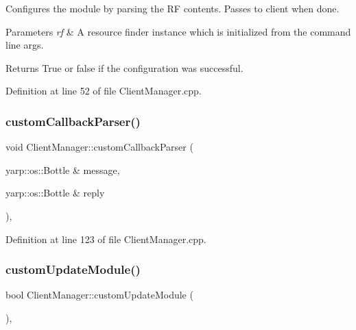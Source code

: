 Configures the module by parsing the RF contents. Passes to client when done. 
\begin{DoxyParams}{Parameters}
{\em rf} & A resource finder instance which is initialized from the command line args.\\
\hline
\end{DoxyParams}
\begin{DoxyReturn}{Returns}
True or false if the configuration was successful. 
\end{DoxyReturn}


Definition at line 52 of file Client\+Manager.\+cpp.

\hypertarget{classocra__recipes_1_1ClientManager_ab81a0bc48b6ac66b97988ef836df3cd6}{}\label{classocra__recipes_1_1ClientManager_ab81a0bc48b6ac66b97988ef836df3cd6} 
\subsubsection{\texorpdfstring{custom\+Callback\+Parser()}{customCallbackParser()}}
{\footnotesize\ttfamily void Client\+Manager\+::custom\+Callback\+Parser (\begin{DoxyParamCaption}\item[{yarp\+::os\+::\+Bottle \&}]{message,  }\item[{yarp\+::os\+::\+Bottle \&}]{reply }\end{DoxyParamCaption})\hspace{0.3cm}{\ttfamily [protected]}, {\ttfamily [virtual]}}



Definition at line 123 of file Client\+Manager.\+cpp.

\hypertarget{classocra__recipes_1_1ClientManager_a51e6fd902ad96b27c2c976305f7306fd}{}\label{classocra__recipes_1_1ClientManager_a51e6fd902ad96b27c2c976305f7306fd} 
\subsubsection{\texorpdfstring{custom\+Update\+Module()}{customUpdateModule()}}
{\footnotesize\ttfamily bool Client\+Manager\+::custom\+Update\+Module (\begin{DoxyParamCaption}{ }\end{DoxyParamCaption})\hspace{0.3cm}{\ttfamily [protected]}, {\ttfamily [virtual]}}



